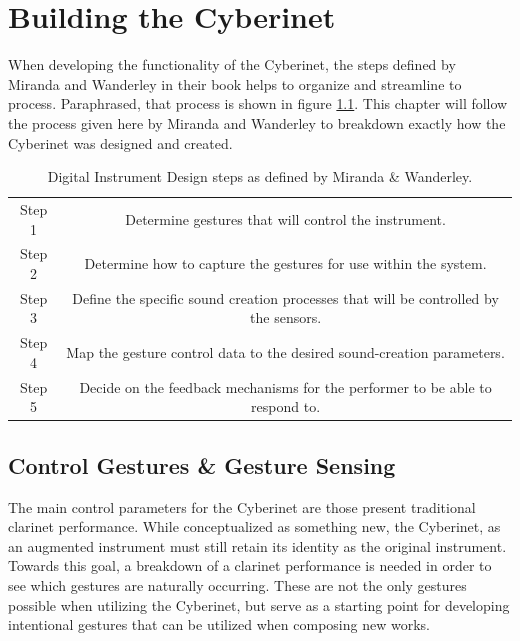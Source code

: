 \chapter{Building the Cyberinet}


When developing the functionality of the Cyberinet, the steps defined by Miranda and Wanderley in their book\cite{miranda_Wanderley_instrumentControl_2006} helps to organize and streamline to process. Paraphrased, that process is shown in figure \ref{fig:DMIProcess}. This chapter will follow the process given here by Miranda and Wanderley to breakdown exactly how the Cyberinet was designed and created.

\begin{table}[]
    \centering
    \begin{tabular}{|c||c|}
    \hline
     Step 1    & Determine gestures that will control the instrument. \\
     Step 2    & Determine how to capture the gestures for use within the system. \\
     Step 3    & Define the specific sound creation processes that will be controlled by the sensors. \\
     Step 4    &  Map the gesture control data to the desired sound-creation parameters.  \\
     Step 5    &  Decide on the feedback mechanisms for the performer to be able to respond to.\\
     \hline
    \end{tabular}
    \caption{Digital Instrument Design steps as defined by Miranda \& Wanderley\cite{miranda_Wanderley_instrumentControl_2006}.}
    \label{fig:DMIProcess}
\end{table}


\section{Control Gestures \& Gesture Sensing}
The main control parameters for the Cyberinet are those present traditional clarinet performance. While conceptualized as something new, the Cyberinet, as an augmented instrument must still retain its identity as the original instrument\cite{miranda_Wanderley_instrumentControl_2006}. Towards this goal, a breakdown of a clarinet performance is needed in order to see which gestures are naturally occurring. These are not the only gestures possible when utilizing the Cyberinet, but serve as a starting point for developing intentional gestures that can be utilized when composing new works.

